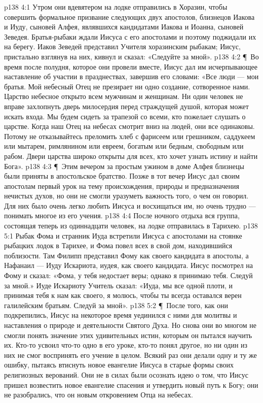 \vs p138 4:1 Утром они вдевятером на лодке отправились в Хоразин, чтобы совершить формальное призвание следующих двух апостолов, близнецов Иакова и Иуду, сыновей Алфея, являвшихся кандидатами Иакова и Иоанна, сыновей Зеведея. Братья\hyp{}рыбаки ждали Иисуса с его апостолами и поэтому поджидали их на берегу. Иаков Зеведей представил Учителя хоразинским рыбакам; Иисус, пристально взглянув на них, кивнул и сказал: «Следуйте за мной».
\vs p138 4:2 \P\ Во время после полудня, которое они провели вместе, Иисус дал им исчерпывающее наставление об участии в празднествах, завершив его словами: «Все люди --- мои братья. Мой небесный Отец не презирает ни одно создание, сотворенное нами. Царство небесное открыто всем мужчинам и женщинам. Ни один человек не вправе захлопнуть дверь милосердия перед страждущей душой, которая может искать входа. Мы будем сидеть за трапезой со всеми, кто пожелает слушать о царстве. Когда наш Отец на небесах смотрит вниз на людей, они все одинаковы. Потому не отказывайтесь преломить хлеб с фарисеем или грешником, саддукеем или мытарем, римлянином или евреем, богатым или бедным, свободным или рабом. Двери царства широко открыты для всех, кто хочет узнать истину и найти Бога».
\vs p138 4:3 \P\ Этим вечером за простым ужином в доме Алфея близнецы были приняты в апостольское братство. Позже в тот вечер Иисус дал своим апостолам первый урок на тему происхождения, природы и предназначения нечистых духов, но они не смогли уразуметь важность того, о чем он говорил. Для них было очень легко любить Иисуса и восхищаться им, но очень трудно --- понимать многое из его учения.
\vs p138 4:4 После ночного отдыха вся группа, состоящая теперь из одиннадцати человек, на лодке отправилась в Тарихею.
\vs p138 5:1 Рыбак Фома и странник Иуда встретили Иисуса с апостолами на стоянке рыбацких лодок в Тарихее, и Фома повел всех в свой дом, находившийся поблизости. Там Филипп представил Фому как своего кандидата в апостолы, а Нафанаил --- Иуду Искариота, иудея, как своего кандидата. Иисус посмотрел на Фому и сказал: «Фома, у тебя недостает веры; однако я принимаю тебя. Следуй за мной.» Иуде Искариоту Учитель сказал: «Иуда, мы все одной плоти, и принимая тебя к нам как своего, я молюсь, чтобы ты всегда оставался верен галилейским братьям. Следуй за мной».
\vs p138 5:2 \P\ После того, как они подкрепились, Иисус на некоторое время уединился с ними для молитвы и наставления о природе и деятельности Святого Духа. Но снова они во многом не смогли понять значение этих удивительных истин, которым он пытался научить их. Кто\hyp{}то усвоил что\hyp{}то одно в его уроке, кто\hyp{}то понял другое, но ни один из них не смог воспринять его учение в целом. Всякий раз они делали одну и ту же ошибку, пытаясь втиснуть новое евангелие Иисуса в старые формы своих религиозных верований. Они не в силах были осознать идею о том, что Иисус пришел возвестить новое евангелие спасения и утвердить новый путь к Богу; они не разобрались, что он  новым откровением Отца на небесах.

